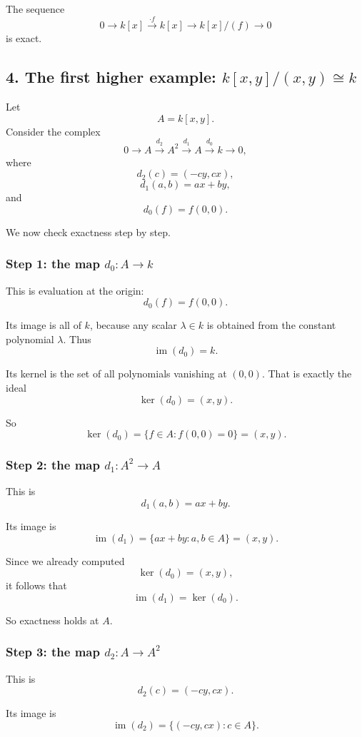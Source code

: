 \documentclass[12pt,a4paper]{article}
\theoremstyle{notespace}
\theoremstyle{definition}
\begin{document}
The sequence
\[
0 \longrightarrow k[x] \xrightarrow{\cdot f} k[x] \longrightarrow k[x]/(f) \longrightarrow 0
\]
is exact.

\bigskip

\subsection{4. The first higher example: \(k[x,y]/(x,y)\cong k\)}

Let
\[
A=k[x,y].
\]
Consider the complex
\[
0 \longrightarrow A \xrightarrow{d_2} A^2 \xrightarrow{d_1} A \xrightarrow{d_0} k \longrightarrow 0,
\]
where
\[
d_2(c)=(-cy,cx),
\]
\[
d_1(a,b)=ax+by,
\]
and
\[
d_0(f)=f(0,0).
\]

We now check exactness step by step.

\subsubsection*{Step 1: the map \(d_0:A\to k\)}

This is evaluation at the origin:
\[
d_0(f)=f(0,0).
\]

Its image is all of \(k\), because any scalar \(\lambda\in k\) is obtained from the constant polynomial \(\lambda\). Thus
\[
\operatorname{im}(d_0)=k.
\]

Its kernel is the set of all polynomials vanishing at \((0,0)\). That is exactly the ideal
\[
\ker(d_0)=(x,y).
\]

So
\[
\ker(d_0)=\{f\in A : f(0,0)=0\}=(x,y).
\]

\subsubsection*{Step 2: the map \(d_1:A^2\to A\)}

This is
\[
d_1(a,b)=ax+by.
\]

Its image is
\[
\operatorname{im}(d_1)=\{ax+by : a,b\in A\}=(x,y).
\]

Since we already computed
\[
\ker(d_0)=(x,y),
\]
it follows that
\[
\operatorname{im}(d_1)=\ker(d_0).
\]

So exactness holds at \(A\).

\subsubsection*{Step 3: the map \(d_2:A\to A^2\)}

This is
\[
d_2(c)=(-cy,cx).
\]

Its image is
\[
\operatorname{im}(d_2)=\{(-cy,cx) : c\in A\}.
\]
\end{document}
